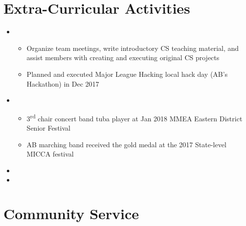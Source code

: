 \documentclass[11pt,a4paper,sans]{moderncv}        %
\begin{document}
\section{Extra-Curricular Activities}

\vspace{5pt}

\begin{itemize}

\item{
{\vspace{3pt} 
\begin{itemize}
\item Organize team meetings, write introductory CS teaching material, and assist members with creating and executing original CS projects
\item  Planned and executed Major League Hacking local hack day (AB's Hackathon) in Dec 2017
\end{itemize}
}}

\item{
{\vspace{3pt} 
\begin{itemize}
\item 3\textsuperscript{rd} chair concert band tuba player at Jan 2018 MMEA Eastern District Senior Festival
\item AB marching band received the gold medal at the 2017 State-level MICCA festival
\end{itemize}}}

\item{}

\item{}
\end{itemize}

\section{Community Service}

\vspace{5pt}
\end{document}
